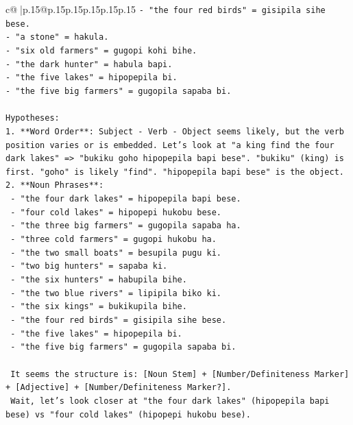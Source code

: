 \documentclass{article}
\begin{document}
{\begin{supertabular}{c@{$\;$}|p{.15\linewidth}@{}p{.15\linewidth}p{.15\linewidth}p{.15\linewidth}p{.15\linewidth}p{.15\linewidth}}
{{{\texttt{{-} "the four red birds" = gisipila sihe bese.} \\
\texttt{{-} "a stone" = hakula.} \\
\texttt{{-} "six old farmers" = gugopi kohi bihe.} \\
\texttt{{-} "the dark hunter" = habula bapi.} \\
\texttt{{-} "the five lakes" = hipopepila bi.} \\
\texttt{{-} "the five big farmers" = gugopila sapaba bi.} \\
\\ 
\texttt{Hypotheses:} \\
\texttt{1. **Word Order**: Subject {-} Verb {-} Object seems likely, but the verb position varies or is embedded. Let's look at "a king find the four dark lakes" => "bukiku goho hipopepila bapi bese". "bukiku" (king) is first. "goho" is likely "find". "hipopepila bapi bese" is the object.} \\
\texttt{2. **Noun Phrases**:} \\
\texttt{   {-} "the four dark lakes" = hipopepila bapi bese.} \\
\texttt{   {-} "four cold lakes" = hipopepi hukobu bese.} \\
\texttt{   {-} "the three big farmers" = gugopila sapaba ha.} \\
\texttt{   {-} "three cold farmers" = gugopi hukobu ha.} \\
\texttt{   {-} "the two small boats" = besupila pugu ki.} \\
\texttt{   {-} "two big hunters" = sapaba ki.} \\
\texttt{   {-} "the six hunters" = habupila bihe.} \\
\texttt{   {-} "the two blue rivers" = lipipila biko ki.} \\
\texttt{   {-} "the six kings" = bukikupila bihe.} \\
\texttt{   {-} "the four red birds" = gisipila sihe bese.} \\
\texttt{   {-} "the five lakes" = hipopepila bi.} \\
\texttt{   {-} "the five big farmers" = gugopila sapaba bi.} \\
\\ 
\texttt{   It seems the structure is: {[}Noun Stem{]} + {[}Number/Definiteness Marker{]} + {[}Adjective{]} + {[}Number/Definiteness Marker?{]}.} \\
\texttt{   Wait, let's look closer at "the four dark lakes" (hipopepila bapi bese) vs "four cold lakes" (hipopepi hukobu bese).} \\
}}}
\end{supertabular}}
\end{document}
